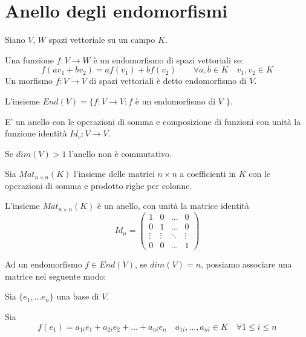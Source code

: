 \documentclass[../main.tex]{subfiles}
\begin{document}
\section{Anello degli endomorfismi}
\begin{definition}
    Siano $V$, $W$ spazi vettoriale su un campo $K$.

    Una funzione $f : V \rightarrow W$ è un endomorfismo di spazi vettoriali se:
    \begin{equation*}
        f(a v_1 + b v_2) = a f(v_1) + b f(v_2) \qquad \forall a,b \in K \quad v_1, v_2 \in K
    \end{equation*}
    Un morfismo $f: V \rightarrow V$ di spazi vettoriali è detto endomorfismo di $V$.

    L'insieme $End(V) = \{ f : V \rightarrow V : f$ è un endomorfismo di $V$ $\}$.

    E' un anello con le operazioni di somma e composizione di funzioni con unità la funzione identità $Id_v : V \rightarrow V$.

    Se $dim(V) > 1$ l'anello non è commutativo.
\end{definition}

\begin{definition}
    Sia $Mat_{n \times n}(K)$ l'insieme delle matrici $n \times n$ a coefficienti in $K$ con le operazioni di somma e prodotto righe per colonne.

    L'insieme $Mat_{n \times n}(K)$ è un anello, con unità la matrice identità
    \begin{equation*}
        Id_n = \begin{pmatrix}
            1      & 0      & \ldots & 0      \\
            0      & 1      & \ldots & 0      \\
            \vdots & \vdots & \ddots & \vdots \\
            0      & 0      & \ldots & 1
        \end{pmatrix}
    \end{equation*}
\end{definition}

Ad un endomorfismo $f \in End(V)$, se $dim(V) = n$, possiamo associare una matrice nel seguente modo:

Sia $\{e_1, \ldots e_n\}$ una base di $V$.

Sia
\begin{equation*}
    f(e_1) = a_{1i} e_1 + a_{2i} e_2 + \ldots + a_{ni} e_n \quad a_{1i},\ldots,a_{ni} \in K \quad \forall 1 \leq i \leq n
\end{equation*}
\end{document}
